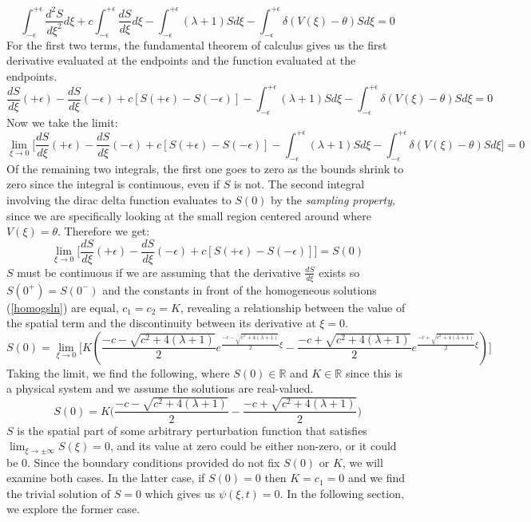 \documentclass[12pt]{article}
\begin{document}
$$ \int_{-\epsilon}^{+\epsilon}\frac{d^2S}{d\xi^2}d\xi + c\int_{-\epsilon}^{+\epsilon}\frac{dS}{d\xi}d\xi - \int_{-\epsilon}^{+\epsilon}(\lambda + 1)Sd\xi - \int_{-\epsilon}^{+\epsilon}\delta(V(\xi)-\theta)Sd\xi = 0 $$
For the first two terms, the fundamental theorem of calculus gives us the first derivative evaluated at the endpoints and the function evaluated at the endpoints.
$$ \frac{dS}{d\xi}(+\epsilon) - \frac{dS}{d\xi}(-\epsilon) + c[S(+\epsilon) - S(-\epsilon)] - \int_{-\epsilon}^{+\epsilon}(\lambda + 1)Sd\xi - \int_{-\epsilon}^{+\epsilon}\delta(V(\xi)-\theta)Sd\xi = 0 $$
Now we take the limit:
$$ \lim_{\xi \to 0} \Bigg[ \frac{dS}{d\xi}(+\epsilon) - \frac{dS}{d\xi}(-\epsilon) + c[S(+\epsilon) - S(-\epsilon)] - \int_{-\epsilon}^{+\epsilon}(\lambda + 1)Sd\xi - \int_{-\epsilon}^{+\epsilon}\delta(V(\xi)-\theta)Sd\xi \Bigg]= 0 $$
Of the remaining two integrals, the first one goes to zero as the bounds shrink to zero since the integral is continuous, even if $S$ is not. The second integral involving the dirac delta function evaluates to $S(0)$ by the \textit{sampling property}, since we are specifically looking at the small region centered around where $V(\xi) = \theta$. Therefore we get:
$$ \lim_{\xi \to 0} \Bigg[ \frac{dS}{d\xi}(+\epsilon) - \frac{dS}{d\xi}(-\epsilon) + c[S(+\epsilon) - S(-\epsilon)] \Bigg] = S(0) $$
$S$ must be continuous if we are assuming that the derivative $\frac{dS}{d\xi}$ exists so $S(0^+) = S(0^-)$ and the constants in front of the homogeneous solutions (\ref{homogsln}) are equal, $c_1 = c_2 = K$, revealing a relationship between the value of the spatial term and the discontinuity between its derivative at $\xi=0$.
$$ S(0) = \lim_{\xi \to 0} \Bigg[ K(\frac{-c-\sqrt{c^2+4(\lambda+1)}}{2}e^{\frac{-c-\sqrt{c^2+4(\lambda+1)}}{2}\xi} - \frac{-c+\sqrt{c^2+4(\lambda+1)}}{2}e^{\frac{-c+\sqrt{c^2+4(\lambda+1)}}{2}\xi})\Bigg] $$
Taking the limit, we find the following, where $S(0)\in \mathbb{R}$ and $K\in\mathbb{R}$ since this is a physical system and we assume the solutions are real-valued.
\begin{equation}\label{Keq}
S(0) = K\Bigg(\frac{-c-\sqrt{c^2+4(\lambda+1)}}{2} - \frac{-c+\sqrt{c^2+4(\lambda+1)}}{2} \Bigg)
\end{equation}
$S$ is the spatial part of some arbitrary perturbation function that satisfies $\lim_{\xi \to \pm \infty}S(\xi) = 0$, and its value at zero could be either non-zero, or it could be 0. Since the boundary conditions provided do not fix $S(0)$ or $K$, we will examine both cases. In the latter case, if $S(0) = 0$ then $K=c_1=0$ and we find the trivial solution of $S=0$ which gives us $\psi(\xi,t) = 0$. In the following section, we explore the former case.
\end{document}
